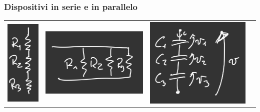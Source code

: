 \documentclass{article}
\begin{document}
\subsubsection{Dispositivi in serie e in parallelo}
\begin{center}
    \begin{tabular}{c c c c}
        \includegraphics[scale=0.37]{Image/Resistori in serie.png} 
        &
         \includegraphics[scale=0.37]{Image/Resistori in parallelo.png} 
        &
        \includegraphics[scale=0.37]{Image/Condensatori in serie.png}

\end{tabular}
\end{center}
\end{document}
